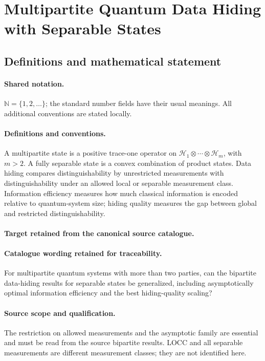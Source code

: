 \documentclass[11pt]{article}
\begin{document}
\section{Multipartite Quantum Data Hiding with Separable States}\label{statement}

\subsection{Definitions and mathematical statement}

\paragraph{Shared notation.}$\mathbb N=\{1,2,\ldots\}$; the standard number fields have their usual meanings. All additional conventions are stated locally.


\paragraph{Definitions and conventions.}
A multipartite state is a positive trace-one operator on $\mathcal H_1\otimes\cdots\otimes\mathcal H_m$, with $m>2$. A fully separable state is a convex combination of product states. Data hiding compares distinguishability by unrestricted measurements with distinguishability under an allowed local or separable measurement class. Information efficiency measures how much classical information is encoded relative to quantum-system size; hiding quality measures the gap between global and restricted distinguishability.

\paragraph{Target retained from the canonical source catalogue.}
\paragraph{Catalogue wording retained for traceability.}
For multipartite quantum systems with more than two parties, can the bipartite data-hiding results for separable states be generalized, including asymptotically optimal information efficiency and the best hiding-quality scaling?

\paragraph{Source scope and qualification.}
The restriction on allowed measurements and the asymptotic family are essential and must be read from the source bipartite results. LOCC and all separable measurements are different measurement classes; they are not identified here.
\end{document}
